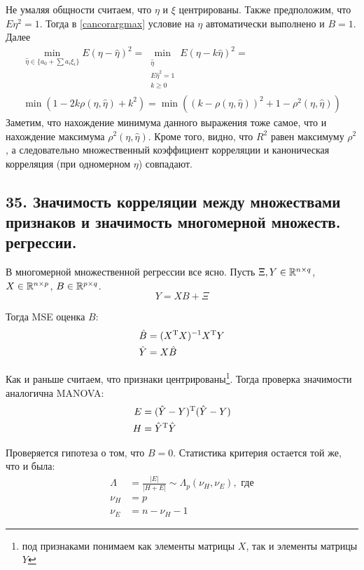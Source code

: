 Не умаляя общности считаем, что $\eta$ и $\xi$ центрированы. Также предположим, что $E\eta^2=1$. Тогда в \eqref{cancorargmax} условие на $\eta$ автоматически выполнено и $B=1$. Далее
\begin{equation}
\begin{split}
\min\limits_{\hat{\eta} \in\{a_0 + \sum a_i \xi_i\}} E\left(\eta-\hat{\eta}\right)^2 = \min\limits_{\substack{\hat{\eta}\\ E\hat{\eta}^2 = 1\\ k \geq 0}}  E\left(\eta-k\hat{\eta}\right)^2 = \\
\min \left(1 - 2k\rho(\eta, \hat{\eta}) + k^2\right) = \min\left( \left(k-\rho(\eta, \hat{\eta})\right)^2 + 1 - \rho^2(\eta, \hat{\eta})\right) 
\end{split}
\end{equation}
Заметим, что нахождение минимума данного выражения тоже самое, что и нахождение максимума $\rho^2(\eta,\hat{\eta})$. Кроме того, видно, что $R^2$ равен максимуму $\rho^2$, а следовательно множественный коэффициент корреляции и каноническая корреляция (при одномерном $\eta$) совпадают. 

\subsection{35. Значимость корреляции между множествами признаков и значимость многомерной множеств. регрессии.}

В многомерной множественной регрессии все ясно. Пусть $\Xi, Y \in \mathbb{R}^{n  \times q}$, $X \in \mathbb{R}^{n \times p}$, $B \in \mathbb{R}^{p \times q}$.
\begin{equation}
Y = X B  + \Xi
\end{equation}

Тогда MSE оценка $B$:
\begin{align}
\hat{B} &=  (X^{\mathrm{T}}X)^{-1}X^{\mathrm{T}}Y \\
\hat{Y} &= X\hat{B}
\end{align}

Как и раньше считаем, что признаки центрированы\footnote{под признаками понимаем как элементы матрицы $X$, так и элементы матрицы $Y$}. Тогда проверка значимости аналогична MANOVA:
\begin{align}
E &= (\hat{Y} - Y)^{\mathrm{T}}(\hat{Y} - Y) \\
H &= \hat{Y}^{\mathrm{T}}\hat{Y} 
\end{align}

Проверяется гипотеза о том, что $B = 0$. Статистика критерия остается той же, что и была:
\begin{align}
\Lambda& = \frac{|E|}{|H + E|} \sim \Lambda_p(\nu_H, \nu_E), \text{ где}\\
\nu_H& = p\\
\nu_E& = n - \nu_H - 1
\end{align}

